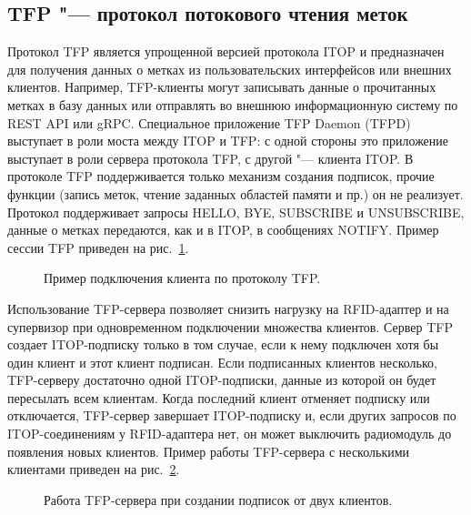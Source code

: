\subsection{TFP "--- протокол потокового чтения меток}\label{sec:ch5_tfp}

Протокол TFP является упрощенной версией протокола ITOP и предназначен для получения данных о метках из пользовательских интерфейсов или внешних клиентов. Например, TFP-клиенты могут записывать данные о прочитанных метках в базу данных или отправлять во внешнюю информационную систему по REST API или gRPC. Специальное приложение TFP Daemon (TFPD) выступает в роли моста между ITOP и TFP: с одной стороны это приложение выступает в роли сервера протокола TFP, с другой "--- клиента ITOP. В протоколе TFP поддерживается только механизм создания подписок, прочие функции (запись меток, чтение заданных областей памяти и пр.) он не реализует. Протокол поддерживает запросы HELLO, BYE, SUBSCRIBE и UNSUBSCRIBE, данные о метках передаются, как и в ITOP, в сообщениях NOTIFY. Пример сессии TFP приведен на рис.~\ref{fig:ch5_tfp_session_1}.

\begin{figure}[ht]
  \caption{Пример подключения клиента по протоколу TFP.}
  \label{fig:ch5_tfp_session_1}
\end{figure}

Использование TFP-сервера позволяет снизить нагрузку на RFID-адаптер и на супервизор при одновременном подключении множества клиентов. Сервер TFP создает ITOP-подписку только в том случае, если к нему подключен хотя бы один клиент и этот клиент подписан. Если подписанных клиентов несколько, TFP-серверу достаточно одной ITOP-подписки, данные из которой он будет пересылать всем клиентам. Когда последний клиент отменяет подписку или отключается, TFP-сервер завершает ITOP-подписку и, если других запросов по ITOP-соединениям у RFID-адаптера нет, он может выключить радиомодуль до появления новых клиентов. Пример работы TFP-сервера с несколькими клиентами приведен на рис.~\ref{fig:ch5_tfp_session_2}.

\begin{figure}[ht]
  \caption{Работа TFP-сервера при создании подписок от двух клиентов.}
  \label{fig:ch5_tfp_session_2}
\end{figure}



